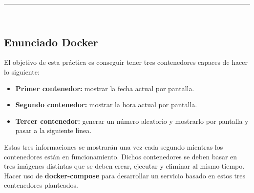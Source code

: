 \newpage
\begin{center}
	{\fboxrule=4pt } \\
	\setcounter{section}{2}
	\setcounter{subsection}{0}
	\rule{15cm}{0pt} \\
\end{center}

\subsection{Enunciado Docker}

\begin{ejer}
    \par El objetivo de esta práctica es conseguir tener tres contenedores capaces de hacer lo siguiente: 
	\begin{itemize}
		\item \textbf{Primer contenedor:} mostrar la fecha actual por pantalla. 
		\item \textbf{Segundo contenedor:} mostrar la hora actual por pantalla. 
		\item \textbf{Tercer contenedor:} generar un número aleatorio y mostrarlo por pantalla y pasar a la siguiente línea.
	\end{itemize}
	\par Estas tres informaciones se mostrarán una vez cada segundo mientras los contenedores están en funcionamiento. 
	Dichos contenedores se deben basar en tres imágenes distintas que se deben crear, ejecutar y eliminar al mismo tiempo. 
	Hacer uso de \textbf{docker-compose} para desarrollar un servicio basado en estos tres contenedores planteados. 
\end{ejer}






